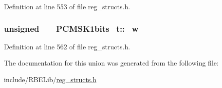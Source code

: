 Definition at line 553 of file reg\+\_\+structs.\+h.

\hypertarget{union_____p_c_m_s_k1bits__t_a318c7bc3e21c629bcbab7c9574db777d}{
\subsubsection[{\+\_\+w}]{\setlength{\rightskip}{0pt plus 5cm}unsigned \+\_\+\+\_\+\+P\+C\+M\+S\+K1bits\+\_\+t\+::\+\_\+w}}\label{union_____p_c_m_s_k1bits__t_a318c7bc3e21c629bcbab7c9574db777d}


Definition at line 562 of file reg\+\_\+structs.\+h.



The documentation for this union was generated from the following file\+:\begin{DoxyCompactItemize}
\item 
include/\+R\+B\+E\+Lib/\hyperlink{reg__structs_8h}{reg\+\_\+structs.\+h}\end{DoxyCompactItemize}
